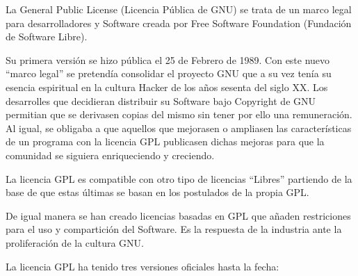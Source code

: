 



La General Public License (Licencia Pública de GNU) se trata de un marco legal
para desarrolladores y Software creada por Free Software Foundation (Fundación
de Software Libre).


Su primera versión se hizo pública el 25 de Febrero de 1989. Con este nuevo
``marco legal'' se pretendía consolidar el proyecto GNU que a su vez tenía su
esencia espiritual en la cultura Hacker de los años sesenta del siglo XX. Los
desarrolles que decidieran distribuir su Software bajo Copyright de GNU
permitian que se derivasen copias del mismo sin tener por ello una remuneración.
Al igual, se obligaba a que aquellos que mejorasen o ampliasen las
características de un programa con la licencia GPL publicasen dichas mejoras
para que la comunidad se siguiera enriqueciendo y creciendo.

La licencia GPL es compatible con otro tipo de licencias ``Libres'' partiendo de
la base de que estas últimas se basan en los postulados de la propia GPL.

De igual manera se han creado licencias basadas en GPL que añaden restriciones
para el uso y compartición del Software. Es la respuesta de la industria ante la
proliferación de la cultura GNU.

La licencia GPL ha tenido tres versiones oficiales hasta la fecha:

